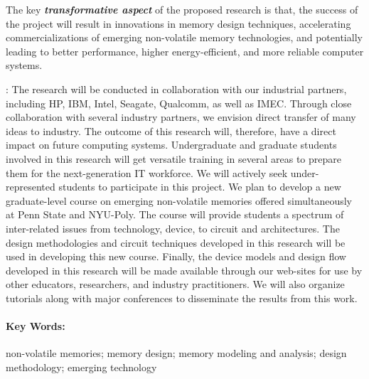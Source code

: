 \documentclass[11pt,letterpaper]{article}
\begin{document}
The key \textit{\textbf{transformative aspect}} of the proposed research is that, the success of the project will result in innovations in memory design techniques, accelerating commercializations of emerging non-volatile memory technologies, and potentially leading to better performance, higher energy-efficient, and more reliable computer systems.

{}: The research will be conducted in collaboration with our industrial partners, including HP, IBM, Intel, Seagate, Qualcomm, as well as IMEC. Through close collaboration with several industry partners, we envision direct transfer of many ideas to industry. The outcome of this research will, therefore, have a direct impact on future computing systems. Undergraduate and graduate students involved in this research will get versatile training in several areas to prepare them for the next-generation IT workforce. We will actively seek under-represented students to participate in this project. We plan to develop a new graduate-level course on emerging non-volatile memories offered simultaneously at Penn State and NYU-Poly. The course will provide students a spectrum of inter-related issues from technology, device, to circuit and architectures. The design methodologies and circuit techniques developed in this research will be used in developing this new course. Finally, the device models and design flow developed in this research will be made available through our web-sites for use by other educators, researchers, and industry practitioners. We will also organize tutorials along with major conferences to disseminate the results from this work.

\paragraph{\textbf{Key Words:}} non-volatile memories; memory design; memory modeling and analysis; design methodology; emerging technology
\end{document}
